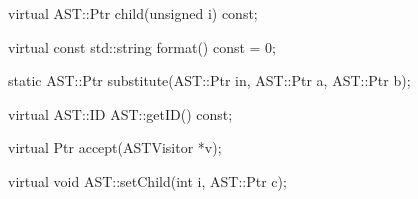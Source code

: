 \begin{apient}
virtual AST::Ptr child(unsigned i) const;
\end{apient}
 
\begin{apient}
virtual const std::string format() const = 0;
\end{apient}

\begin{apient}
static AST::Ptr substitute(AST::Ptr in, AST::Ptr a, AST::Ptr b); 
\end{apient}

\begin{apient} 
virtual AST::ID AST::getID() const;
\end{apient}

\begin{apient}
virtual Ptr accept(ASTVisitor *v);
\end{apient}

\begin{apient}
virtual void AST::setChild(int i, AST::Ptr c);
\end{apient}

